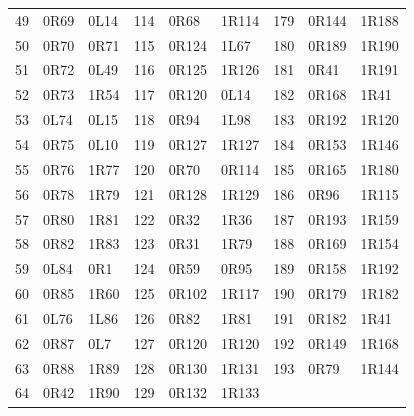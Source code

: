 {\begin{longtable}{@{}rll@{\hspace{1.4em}}rll@{\hspace{1.4em}}rll@{}}
49 & 0R69 & 0L14 & 114 & 0R68 & 1R114 & 179 & 0R144 & 1R188\\
50 & 0R70 & 0R71 & 115 & 0R124 & 1L67 & 180 & 0R189 & 1R190\\
51 & 0R72 & 0L49 & 116 & 0R125 & 1R126 & 181 & 0R41 & 1R191\\
52 & 0R73 & 1R54 & 117 & 0R120 & 0L14 & 182 & 0R168 & 1R41\\
53 & 0L74 & 0L15 & 118 & 0R94 & 1L98 & 183 & 0R192 & 1R120\\
54 & 0R75 & 0L10 & 119 & 0R127 & 1R127 & 184 & 0R153 & 1R146\\
55 & 0R76 & 1R77 & 120 & 0R70 & 0R114 & 185 & 0R165 & 1R180\\
56 & 0R78 & 1R79 & 121 & 0R128 & 1R129 & 186 & 0R96 & 1R115\\
57 & 0R80 & 1R81 & 122 & 0R32 & 1R36 & 187 & 0R193 & 1R159\\
58 & 0R82 & 1R83 & 123 & 0R31 & 1R79 & 188 & 0R169 & 1R154\\
59 & 0L84 & 0R1 & 124 & 0R59 & 0R95 & 189 & 0R158 & 1R192\\
60 & 0R85 & 1R60 & 125 & 0R102 & 1R117 & 190 & 0R179 & 1R182\\
61 & 0L76 & 1L86 & 126 & 0R82 & 1R81 & 191 & 0R182 & 1R41\\
62 & 0R87 & 0L7 & 127 & 0R120 & 1R120 & 192 & 0R149 & 1R168\\
63 & 0R88 & 1R89 & 128 & 0R130 & 1R131 & 193 & 0R79 & 1R144\\
64 & 0R42 & 1R90 & 129 & 0R132 & 1R133 &  &  & \\
\bottomrule
\end{longtable}}
